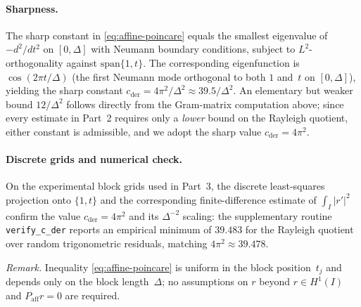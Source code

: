 \paragraph{Sharpness.}
The sharp constant in \eqref{eq:affine-poincare} equals the smallest eigenvalue
of $-d^2/dt^2$ on $[0,\Delta]$ with Neumann boundary conditions, subject to
$L^2$-orthogonality against $\mathrm{span}\{1,t\}$.  The corresponding
eigenfunction is $\cos(2\pi t/\Delta)$ (the first Neumann mode orthogonal to both
$1$ and~$t$ on $[0,\Delta]$), yielding the sharp constant
$c_{\mathrm{der}}=4\pi^2/\Delta^2 \approx 39.5/\Delta^2$.
An elementary but weaker bound $12/\Delta^2$ follows directly from the Gram-matrix
computation above; since every estimate in Part~2 requires only a \emph{lower}
bound on the Rayleigh quotient, either constant is admissible, and we adopt the
sharp value $c_{\mathrm{der}}=4\pi^2$.

\paragraph{Discrete grids and numerical check.}
On the experimental block grids used in Part~3, the discrete least-squares projection
onto $\{1,t\}$ and the corresponding finite-difference estimate of $\int_I |r'|^2$
confirm the value $c_{\mathrm{der}}=4\pi^2$ and its $\Delta^{-2}$ scaling: the
supplementary routine \texttt{verify\_c\_der} reports an empirical minimum of
$39.483$ for the Rayleigh quotient over random trigonometric residuals,
matching $4\pi^2\approx39.478$.

\medskip
\noindent
\emph{Remark.}
Inequality \eqref{eq:affine-poincare} is uniform in the block position~$t_j$
and depends only on the block length~$\Delta$; no assumptions on $r$ beyond
$r\in H^1(I)$ and $P_{\mathrm{aff}} r=0$ are required.
